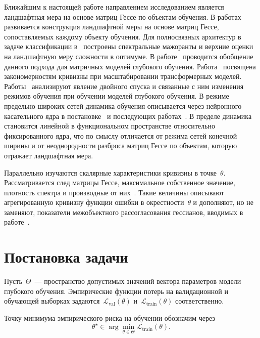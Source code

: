 \documentclass[11pt]{ubs}
\begin{document}
Ближайшим к настоящей работе направлением исследованием является ландшафтная мера на основе матриц Гессе по объектам обучения.
В работах~\cite{kiselev2024,meshkov2024ispras} развивается конструкция ландшафтной меры на основе матриц Гессе, сопоставляемых каждому объекту обучения.
Для полносвязных архитектур в задаче классификации в~\cite{kiselev2024} построены спектральные мажоранты и верхние оценки на ландшафтную меру сложности в оптимуме.
В работе~\cite{meshkov2024ispras} проводится обобщение данного подхода для матричных моделей глубокого обучения.
Работа~\cite{petrov2025curvaturegap} посвящена закономерностям кривизны при масштабировании трансформерных моделей.
Работы~\cite{singh2024lmc,singh2022double} анализируют явление двойного спуска и связанные с ним изменения режимов обучения при обучении моделей глубокого обучения.
В режиме предельно широких сетей динамика обучения описывается через нейронного касательного ядра в постановке~\cite{jacot2018ntk} и последующих работах~\cite{lee2018wide}.
В пределе динамика становится линейной в функциональном пространстве относительно фиксированного ядра, что по смыслу отличается от режима сетей конечной ширины и от неоднородности разброса матриц Гессе по объектам, которую отражает ландшафтная мера.

Параллельно изучаются скалярные характеристики кривизны в точке~$\theta$. Рассматривается след матрицы Гессе, максимальное собственное значение, плотность спектра и производные от них~\cite{ghorbani2019,papyan2019,wu2022dissecting,petrov2025curvaturegap}.
Такие величины описывают агрегированную кривизну функции ошибки в окрестности~$\theta$ и дополняют, но не заменяют, показатели межобъектного рассогласования гессианов, вводимых в работе~\cite{kiselev2024}.

\section{Постановка задачи}\label{sec:problem}

Пусть~$\Theta$~--- пространство допустимых значений вектора параметров модели глубокого обучения.
Эмпирические функции потерь на валидационной и обучающей выборках задаются~$\mathcal{L}_{\mathrm{val}}(\theta)$ и~$\mathcal{L}_{\mathrm{train}}(\theta)$ соответственно.

Точку минимума эмпирического риска на обучении обозначим через
\begin{equation}
  \theta^\star \in \arg\min_{\theta\in\Theta} \mathcal{L}_{\mathrm{train}}(\theta).
\end{equation}
\end{document}
